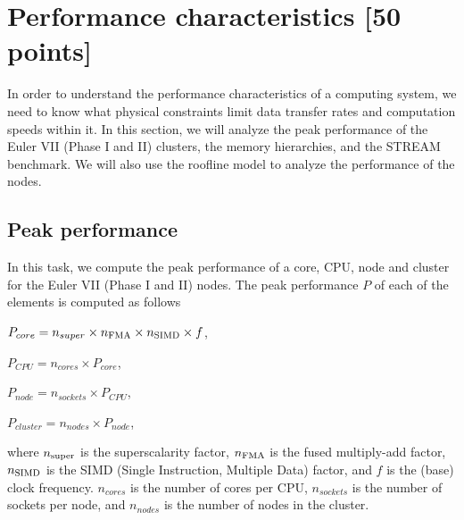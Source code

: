 \documentclass[unicode,11pt,a4paper,oneside,numbers=endperiod,openany]{scrartcl}
\begin{document}
\section{Performance characteristics [50 points]}
In order to understand the performance characteristics of a computing system, we need to
know what physical constraints limit data transfer rates and computation speeds within it.
In this section, we will analyze the peak performance of the Euler VII (Phase I and II) clusters,
the memory hierarchies, and the STREAM benchmark. We will also use the roofline model to analyze the
performance of the nodes.

\subsection{Peak performance}\label{sec:peak_performance}
In this task, we compute the peak performance of a core, CPU, node and cluster for the Euler VII
(Phase I and II) nodes. The peak performance $P$ of each of the elements is computed as follows
\begin{center}
    $P_{core}  = n_{super} \times n_{\tiny{\textrm{FMA}}} \times n_{\tiny{\textrm{SIMD}}} \times f$,
\end{center}
\begin{center}
    $P_{CPU} = n_{cores} \times P_{core}$,
\end{center}
\begin{center}
    $P_{node} = n_{sockets} \times P_{CPU}$,
\end{center}
\begin{center}
    $P_{cluster} = n_{nodes} \times P_{node}$,
\end{center}
where $n_{\tiny{\textrm{super}}}$ is the superscalarity factor, $n_{\tiny{\textrm{FMA}}}$ is the fused 
multiply-add factor, $n_{\tiny{\textrm{SIMD}}}$ is the SIMD (Single Instruction, Multiple Data) factor,
and $f$ is the (base) clock frequency. $n_{cores}$ is the number of cores per CPU, $n_{sockets}$ is the 
number of sockets per node, and $n_{nodes}$ is the number of nodes in the cluster.
\end{document}
